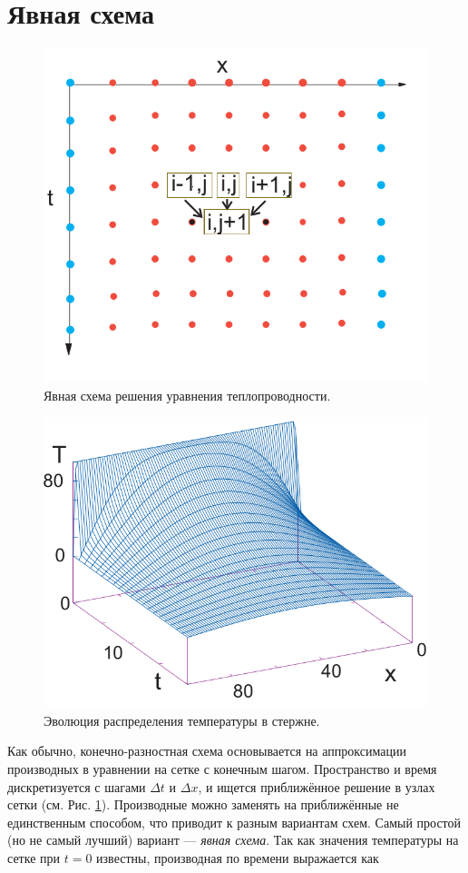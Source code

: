 \documentclass[12pt]{article}
\begin{document}
\section*{Явная схема}
\begin{figure}
\begin{center}
\includegraphics[width=0.6\linewidth]{./figs/01.png}
\caption{Явная схема решения уравнения теплопроводности.}
\label{fig:explicit}
\end{center}
\end{figure}
\begin{figure}
\begin{center}
\includegraphics[width=0.6\linewidth]{./figs/02.png}
\caption{Эволюция распределения температуры в стержне.}
\label{fig:solution}
\end{center}
\end{figure}
Как обычно, конечно-разностная схема основывается на аппроксимации производных в уравнении на сетке с конечным шагом. Пространство и время дискретизуется с шагами $\Delta t$ и $\Delta x$, и ищется приближённое решение в узлах сетки (см. Рис. \ref{fig:explicit}). Производные можно заменять на приближённые не единственным способом, что приводит к разным вариантам схем. Самый простой (но не самый лучший) вариант --- \textit{явная схема}. Так как значения температуры на сетке при $t=0$ известны, производная по времени выражается как
\end{document}
